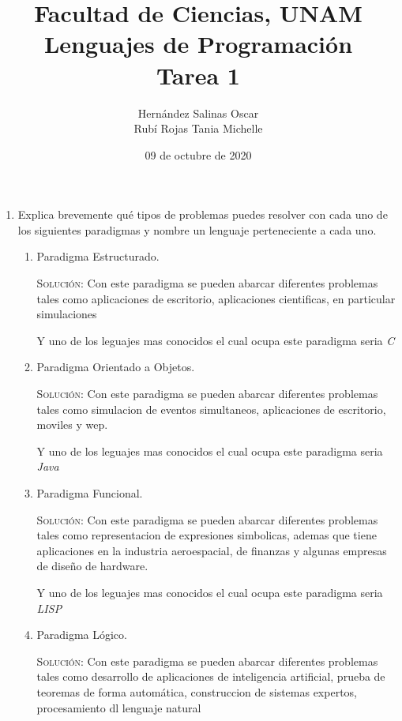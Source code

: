 \documentclass[letterpaper,11pt]{article}
\title{Facultad de Ciencias, UNAM \\ 
       Lenguajes de Programación \\ 
       Tarea 1}
\author{Hernández Salinas Oscar \\ 
        Rubí Rojas Tania Michelle }
\date{09 de octubre de 2020}
\begin{document}
\maketitle

\begin{enumerate}
    \item Explica brevemente qué tipos de problemas puedes resolver con cada uno
    de los siguientes paradigmas y nombre un lenguaje perteneciente a cada uno.
    \begin{enumerate}
        \item Paradigma Estructurado.
        
        \textsc{Solución:} Con este paradigma se pueden abarcar diferentes problemas tales como aplicaciones de 
        escritorio, aplicaciones cientificas, en particular simulaciones  
        
        Y uno de los leguajes mas conocidos el cual ocupa este paradigma seria \textit{C}

        \item Paradigma Orientado a Objetos.

        \textsc{Solución:} Con este paradigma se pueden abarcar diferentes problemas tales como simulacion de 
        eventos simultaneos, aplicaciones de escritorio, moviles y wep.
        
        Y uno de los leguajes mas conocidos el cual ocupa este paradigma seria \textit{Java}

        \item Paradigma Funcional.

        \textsc{Solución:} Con este paradigma se pueden abarcar diferentes problemas tales como representacion
        de expresiones simbolicas, ademas que tiene aplicaciones en la industria aeroespacial, de finanzas y 
        algunas empresas de diseño de hardware.
        
        Y uno de los leguajes mas conocidos el cual ocupa este paradigma seria \textit{LISP}

        \item Paradigma Lógico.

        \textsc{Solución:} Con este paradigma se pueden abarcar diferentes problemas tales como desarrollo de 
        aplicaciones de inteligencia artificial, prueba de teoremas de forma automática, construccion de sistemas 
        expertos, procesamiento dl lenguaje natural 
        

\end{enumerate}
\end{enumerate}
\end{document}
